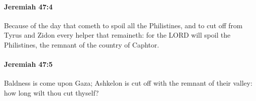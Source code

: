 		\paragraph{Jeremiah 47:4} %
			\label{JEREMIAH-47-4}

			Because of the day that cometh to spoil all the Philistines, and to cut off from Tyrus and Zidon every helper that remaineth: for the LORD will spoil the Philistines, the remnant of the country of Caphtor.


		\paragraph{Jeremiah 47:5} %
			\label{JEREMIAH-47-5}

			Baldness is come upon Gaza; Ashkelon is cut off with the remnant of their valley: how long wilt thou cut thyself?


